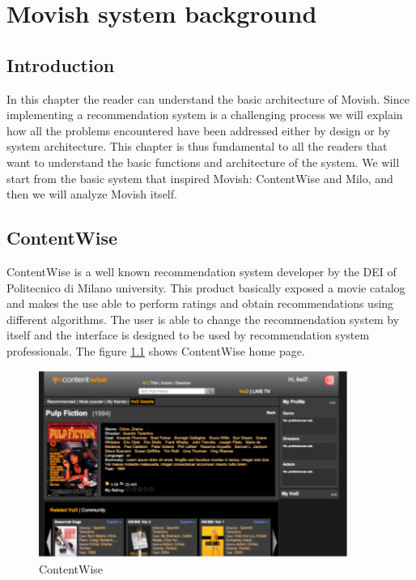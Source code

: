 \chapter{Movish system background}
\label{chapter:movish_system}

\section{Introduction}
\label{sec:movish_introduction}

In this chapter the reader can understand the basic architecture of Movish. Since implementing a recommendation system is a challenging process we will explain how all the problems encountered have been addressed either by design or by system architecture. This chapter is thus fundamental to all the readers that want to understand the basic functions and architecture of the system.
We will start from the basic system that inspired Movish: ContentWise and Milo, and then we will analyze Movish itself.

\section{ContentWise}
\label{sec:contentwise}

ContentWise is a well known recommendation system developer by the \ac{DEI} of Politecnico di Milano university. This product basically exposed a movie catalog and makes the use able to perform ratings and obtain recommendations using different algorithms. The user is able to change the recommendation system by itself and the interface is designed to be used by recommendation system professionals. The figure \ref{fig:contentwise} shows ContentWise home page.    

\begin{figure}
  \centering
  \includegraphics[width=0.9\textwidth]{figures/contentwise-homepage.png}
  \caption{ContentWise}
  \label{fig:contentwise}
\end{figure}

